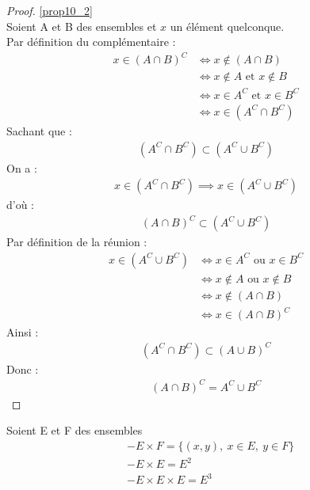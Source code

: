 \begin{proof}
	\ref{prop10_2} 
	\\
	Soient A et B des ensembles et $x$ un élément quelconque. \\
	\framebox{$\subset$} Par définition du complémentaire :
	\begin{align*}
		x \in (A \cap B)^C &\iff x \notin (A \cap B) \\ 
		&\iff x \notin A \text{ et } x \notin B \\
		&\iff x \in A^C \text{ et } x \in B^C \\
		&\iff x \in (A^C \cap B^C)
	\end{align*}
	Sachant que :
	\begin{align*}
		(A^C \cap B^C) \subset (A^C \cup B^C)
	\end{align*}
	On a :
	\begin{align*}
		x \in (A^C \cap B^C) \implies x \in (A^C \cup B^C)
	\end{align*}
	d'où :
	\begin{align*}
		(A \cap B)^C \subset (A^C \cup B^C)
	\end{align*}
	\framebox{$\supset$} Par définition de la réunion :
	\begin{align*}
		x \in (A^C \cup B^C) &\iff x \in A^C \text{ ou } x \in B^C \\
		&\iff x \notin A \text{ ou } x \notin B \\
		&\iff x \notin (A \cap B) \\
		&\iff x \in (A \cap B)^C
	\end{align*}
	Ainsi : 
	\begin{align*}
		(A^C \cap B^C) \subset (A \cup B)^C
	\end{align*}
	Donc :
	\begin{align*}
		(A \cap B)^C = A^C \cup B^C
	\end{align*}
\end{proof}

\begin{definitionbox}
    \begin{definition}
	Soient E et F des ensembles
	\begin{align*}
		&- E \times F = \{(x, y),\ x \in E,\ y \in F\} \\
		&- E \times E = E^2 \\
		&- E \times E \times E = E^3
	\end{align*}
\end{definition}
\end{definitionbox}

